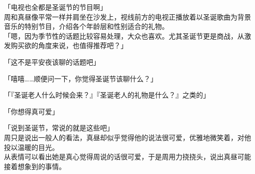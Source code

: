 「电视也全都是圣诞节的节目啊」\\

周和真昼像平常一样并肩坐在沙发上，视线前方的电视正播放着以圣诞歌曲为背景音乐的特别节目，介绍各个年龄层和性别适合的礼物。\\

「嗯，因为季节性的话题比较容易处理，大众也喜欢。尤其圣诞节更是商战，从激发购买欲的角度来说，也值得推荐吧？」

「这不是平安夜该聊的话题吧」

「嘻嘻……顺便问一下，你觉得圣诞节该聊什么？」

「『圣诞老人什么时候会来？』『圣诞老人的礼物是什么？』之类的」

「你想得真可爱」

「说到圣诞节，常说的就是这些吧」\\

周只是说出一般人的看法，真昼却似乎觉得他的说法很可爱，优雅地微笑着，对他投以温暖的目光。\\

从表情可以看出她是真心觉得周说的话很可爱，于是周用力挠挠头，说出真昼可能接着想象到的事情。\\


